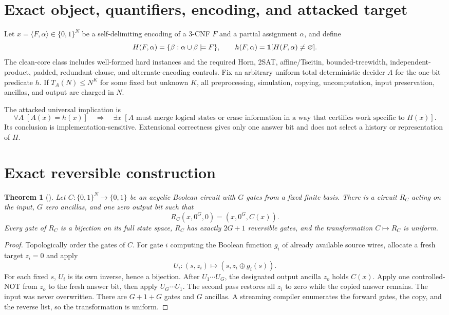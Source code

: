 \documentclass[11pt]{article}
\newtheorem{theorem}{Theorem}
\newcommand{\claim}[1]{\texttt{\detokenize{#1}}}
\begin{document}
\section{Exact object, quantifiers, encoding, and attacked target}
Let $x=\langle F,\alpha\rangle\in\{0,1\}^N$ be a self-delimiting encoding of
a 3-CNF $F$ and a partial assignment $\alpha$, and define
\[
 H(F,\alpha)=\{\beta:\alpha\cup\beta\models F\},\qquad
 h(F,\alpha)={\bf1}[H(F,\alpha)\ne\varnothing].
\]
The clean-core class includes well-formed hard instances and the required
Horn, 2SAT, affine/Tseitin, bounded-treewidth, independent-product, padded,
redundant-clause, and alternate-encoding controls.  Fix an arbitrary uniform
total deterministic decider $A$ for the one-bit predicate $h$.  If
$T_A(N)\le N^K$ for some fixed but unknown $K$, all preprocessing,
simulation, copying, uncomputation, input preservation, ancillas, and output
are charged in $N$.

The attacked universal implication is
\[
 \forall A\;[A(x)=h(x)]\quad\Longrightarrow\quad
 \exists x\;[\text{$A$ must merge logical states or erase information in a
 way that certifies work specific to $H(x)$}].
\]
Its conclusion is implementation-sensitive.  Extensional correctness gives
only one answer bit and does not select a history or representation of $H$.

\section{Exact reversible construction}

\begin{theorem}[\claim{REVERSIBLE-COMPUTE-COPY-UNCOMPUTE1}]
Let $C:\{0,1\}^N\to\{0,1\}$ be an acyclic Boolean circuit with $G$ gates
from a fixed finite basis.  There is a circuit $R_C$ acting on the input,
$G$ zero ancillas, and one zero output bit such that
\[
 R_C(x,0^G,0)=(x,0^G,C(x)).
\]
Every gate of $R_C$ is a bijection on its full state space, $R_C$ has exactly
$2G+1$ reversible gates, and the transformation $C\mapsto R_C$ is uniform.
\end{theorem}

\begin{proof}
Topologically order the gates of $C$.  For gate $i$ computing the Boolean
function $g_i$ of already available source wires, allocate a fresh target
$z_i=0$ and apply
\[
 U_i:(s,z_i)\longmapsto (s,z_i\oplus g_i(s)).
\]
For each fixed $s$, $U_i$ is its own inverse, hence a bijection.  After
$U_1\cdots U_G$, the designated output ancilla $z_o$ holds $C(x)$.  Apply one controlled-NOT
from $z_o$ to the fresh answer bit, then apply
$U_G\cdots U_1$.  The second pass restores all $z_i$ to zero while the copied
answer remains.  The input was never overwritten.  There are $G+1+G$ gates
and $G$ ancillas.  A streaming compiler enumerates the forward gates, the
copy, and the reverse list, so the transformation is uniform.
\end{proof}
\end{document}
